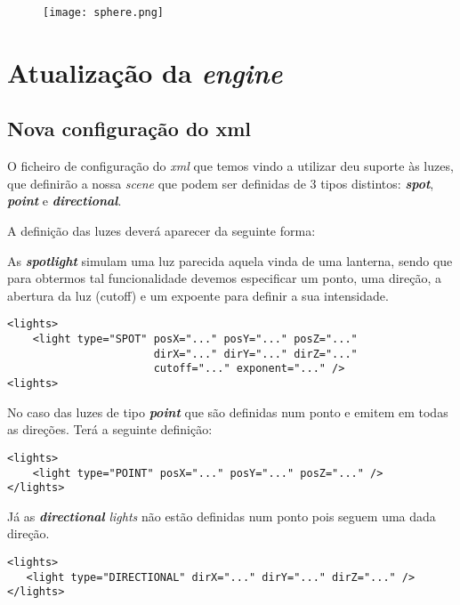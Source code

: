 \documentclass[11pt,a4paper]{report}
\begin{document}
\begin{figure}[h]
    \centering
    \texttt{[image: sphere.png]}
\end{figure}
\chapter{Atualização da \emph{engine}}

\section{Nova configuração do xml}
O ficheiro de configuração do \emph{xml} que temos vindo a utilizar deu suporte às luzes, que definirão a nossa \emph{scene} que podem ser definidas de 3 tipos distintos: \textbf{\emph{spot}}, \textbf{ \emph{point}} e \textbf{\emph{directional}}.

A definição das luzes deverá aparecer da seguinte forma: 

As \textbf{\emph{spotlight}} simulam uma luz parecida aquela vinda de uma lanterna, sendo que para obtermos tal funcionalidade devemos especificar um ponto, uma direção, a abertura da luz (cutoff) e um expoente para definir a sua intensidade.

\begin{lstlisting}[style = xml]
<lights>
    <light type="SPOT" posX="..." posY="..." posZ="..."
                       dirX="..." dirY="..." dirZ="..."
                       cutoff="..." exponent="..." />
<lights>
\end{lstlisting}

No caso das luzes de tipo \textbf{ \emph{point}} que são definidas num ponto e emitem em todas as direções. Terá a seguinte definição:

\begin{lstlisting}[style = xml]
<lights>
    <light type="POINT" posX="..." posY="..." posZ="..." />
</lights>
\end{lstlisting}

Já as \textbf{\emph{directional}} \emph{lights} não estão definidas num ponto pois seguem uma dada direção.
\begin{lstlisting}[style = xml]
<lights>
   <light type="DIRECTIONAL" dirX="..." dirY="..." dirZ="..." />
</lights>
\end{lstlisting}

\iffalse 
Para todos os tipos de luzes enunciados a cima podem especificar a intensidade RGB das luzes no que toca à componente difusa, ambiente e especular, assim:
\begin{lstlisting}[style = xml]
<light ... ambiR="..." ambiG="..." ambiB="..."
           specR="..." specG="..." specB="..."
     diffR="..." diffG="..." diffB="..." />
\end{lstlisting}
\fi
\end{document}
